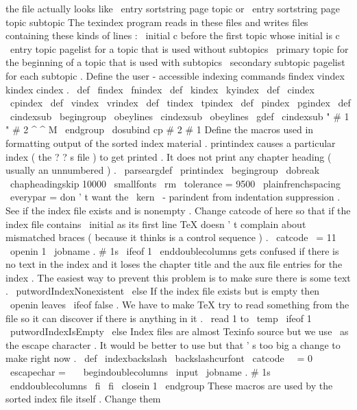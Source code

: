 {{{{the
file
actually
looks
like
%
\
entry
{
sortstring
}
{
page
}
{
topic
}
%
or
%
\
entry
{
sortstring
}
{
page
}
{
topic
}
{
subtopic
}
%
The
texindex
program
reads
in
these
files
and
writes
files
%
containing
these
kinds
of
lines
:
%
\
initial
{
c
}
%
before
the
first
topic
whose
initial
is
c
%
\
entry
{
topic
}
{
pagelist
}
%
for
a
topic
that
is
used
without
subtopics
%
\
primary
{
topic
}
%
for
the
beginning
of
a
topic
that
is
used
with
subtopics
%
\
secondary
{
subtopic
}
{
pagelist
}
%
for
each
subtopic
.
%
Define
the
user
-
accessible
indexing
commands
%
findex
vindex
kindex
cindex
.
\
def
\
findex
{
\
fnindex
}
\
def
\
kindex
{
\
kyindex
}
\
def
\
cindex
{
\
cpindex
}
\
def
\
vindex
{
\
vrindex
}
\
def
\
tindex
{
\
tpindex
}
\
def
\
pindex
{
\
pgindex
}
\
def
\
cindexsub
{
\
begingroup
\
obeylines
\
cindexsub
}
{
\
obeylines
%
\
gdef
\
cindexsub
"
#
1
"
#
2
^
^
M
{
\
endgroup
%
\
dosubind
{
cp
}
{
#
2
}
{
#
1
}
}
}
%
Define
the
macros
used
in
formatting
output
of
the
sorted
index
material
.
%
printindex
causes
a
particular
index
(
the
?
?
s
file
)
to
get
printed
.
%
It
does
not
print
any
chapter
heading
(
usually
an
unnumbered
)
.
%
\
parseargdef
\
printindex
{
\
begingroup
\
dobreak
\
chapheadingskip
{
10000
}
%
%
\
smallfonts
\
rm
\
tolerance
=
9500
\
plainfrenchspacing
\
everypar
=
{
}
%
don
'
t
want
the
\
kern
\
-
parindent
from
indentation
suppression
.
%
%
See
if
the
index
file
exists
and
is
nonempty
.
%
Change
catcode
of
here
so
that
if
the
index
file
contains
%
\
initial
{
}
%
as
its
first
line
TeX
doesn
'
t
complain
about
mismatched
braces
%
(
because
it
thinks
}
is
a
control
sequence
)
.
\
catcode
\
=
11
\
openin
1
\
jobname
.
#
1s
\
ifeof
1
%
\
enddoublecolumns
gets
confused
if
there
is
no
text
in
the
index
%
and
it
loses
the
chapter
title
and
the
aux
file
entries
for
the
%
index
.
The
easiest
way
to
prevent
this
problem
is
to
make
sure
%
there
is
some
text
.
\
putwordIndexNonexistent
\
else
%
%
If
the
index
file
exists
but
is
empty
then
\
openin
leaves
\
ifeof
%
false
.
We
have
to
make
TeX
try
to
read
something
from
the
file
so
%
it
can
discover
if
there
is
anything
in
it
.
\
read
1
to
\
temp
\
ifeof
1
\
putwordIndexIsEmpty
\
else
%
Index
files
are
almost
Texinfo
source
but
we
use
\
as
the
escape
%
character
.
It
would
be
better
to
use
but
that
'
s
too
big
a
change
%
to
make
right
now
.
\
def
\
indexbackslash
{
\
backslashcurfont
}
%
\
catcode
\
\
=
0
\
escapechar
=
\
\
\
begindoublecolumns
\
input
\
jobname
.
#
1s
\
enddoublecolumns
\
fi
\
fi
\
closein
1
\
endgroup
}
%
These
macros
are
used
by
the
sorted
index
file
itself
.
%
Change
them
}}}
